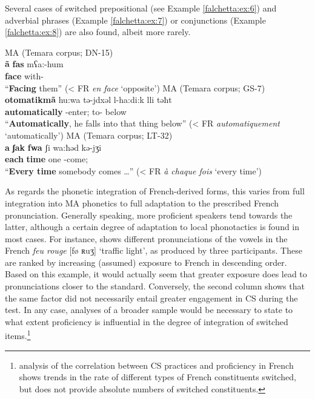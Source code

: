 \documentclass[output=paper]{langscibook}
\begin{document}
\noindent
Several cases of switched prepositional (see Example \ref{falchetta:ex:6}) and adverbial phrases (Example \ref{falchetta:ex:7}) or conjunctions (Example \ref{falchetta:ex:8}) are also found, albeit more rarely.

\begin{exe}
	\ex\label{falchetta:ex:6} \gls*{MA} (Temara corpus; DN-15) \\
	\gll \textbf{ã} \textbf{fas}   mʕa:-hum\\
	\textbf{\PREP{}} \textbf{face} with-\Tpl{} \\
	\glt “\textbf{Facing} them” (< FR \textit{en face} ‘opposite’)\footnotemark
	\ex\label{falchetta:ex:7} \gls*{MA} (Temara corpus; GS-7) \\
	\gll \textbf{otomatikmã}  hu:wa   tǝ-jdxǝl   l-ha:di:k   lli   tǝħt\\
	\textbf{automatically} \Third\M\SG{} \PRVB-enter;\Third\M\SG{} to-\DEM{} \REL{} below \\
	\glt “\textbf{Automatically}, he falls into that thing below” (< FR \textit{automatiquement} ‘automatically’)
	\ex\label{falchetta:ex:8} \gls*{MA} (Temara corpus; LT-32) \\
	\gll \textbf{a}   \textbf{ʃak}   \textbf{fwa}   ʃi   wa:ħǝd   kǝ-jʒi\\
	\textbf{\PREP{}} \textbf{each} \textbf{time} \INDF{} one \PRVB-come;\Third\M\SG{} \\
	\glt “\textbf{Every time} somebody comes \dots” (< FR \textit{à chaque fois} ‘every time’)
\end{exe}

\noindent
As regards the phonetic integration of French-derived forms, this varies from full integration into \gls*{MA} phonetics to full adaptation to the prescribed French pronunciation. Generally speaking, more proficient speakers tend towards the latter, although a certain degree of adaptation to local phonotactics is found in most cases. For instance,  shows different pronunciations of the vowels in the French \textit{feu rouge} [fø ʀuʒ] ‘traffic light’, as produced by three participants. These are ranked by increasing (assumed) exposure to French in descending order. Based on this example, it would actually seem that greater exposure does lead to pronunciations closer to the standard. Conversely, the second column shows that the same factor did not necessarily entail greater engagement in \gls*{CS} during the test. In any case, analyses of a broader sample would be necessary to state to what extent proficiency is influential in the degree of integration of switched items.\footnote{ analysis of the correlation between \gls*{CS} practices  and proficiency in French shows trends in the rate of different types of French constituents switched, but does not provide absolute numbers of switched constituents.}
\end{document}
